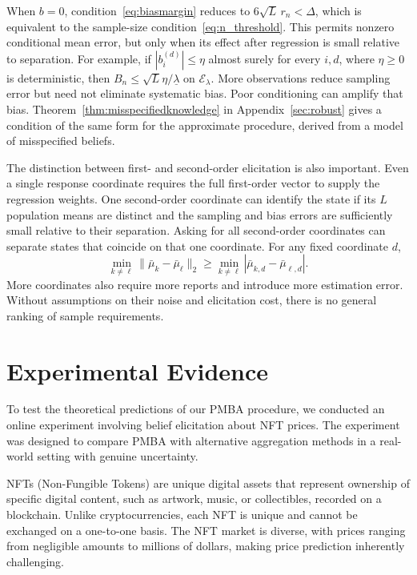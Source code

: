 \documentclass[12pt,reqno]{amsart}
\begin{document}
When $b=0$,
condition~\eqref{eq:biasmargin} reduces to $6\sqrt L\,r_n<\Delta$,
which is equivalent to the sample-size condition~\eqref{eq:n_threshold}. This permits nonzero conditional mean
error, but only when its effect after regression is small relative to
separation. For example, if $|b_i^{(d)}|\leq\eta$ almost surely for every
$i,d$, where $\eta\ge0$ is deterministic, then $B_n\leq\sqrt
L\eta/\underline\lambda$ on $\mathcal{E}_\lambda$. More observations reduce sampling
error but need not eliminate systematic bias. Poor conditioning can amplify
that bias. Theorem~\ref{thm:misspecifiedknowledge} in Appendix~\ref{sec:robust} gives a condition of the same form for the approximate procedure, derived from a model of misspecified beliefs.

The distinction between first- and second-order elicitation is also
important. Even a single response coordinate requires the full first-order
vector to supply the regression weights. One second-order
coordinate can identify the state if its $L$ population means are distinct
and the sampling and bias errors are sufficiently small relative to their
separation. Asking for all second-order coordinates can separate states
that coincide on that one coordinate. For any fixed coordinate $d$,
\begin{equation*}
\min_{k\ne\ell}\|\bar\mu_k-\bar\mu_\ell\|_2
\geq\min_{k\ne\ell}|\bar\mu_{k,d}-\bar\mu_{\ell,d}|.
\end{equation*}
More coordinates also require more reports and introduce
more estimation error. Without assumptions on their noise and elicitation
cost, there is no general ranking of sample requirements.

\section{Experimental Evidence}\label{sec:experiment}

To test the theoretical predictions of our PMBA procedure, we conducted an online experiment involving belief elicitation about NFT prices. The experiment was designed to  compare PMBA with alternative aggregation methods in a real-world setting with genuine uncertainty.

NFTs (Non-Fungible Tokens) are unique digital assets that represent ownership of specific digital content, such as artwork, music, or collectibles, recorded on a blockchain. Unlike cryptocurrencies, each NFT is unique and cannot be exchanged on a one-to-one basis. The NFT market is diverse, with prices ranging from negligible amounts to millions of dollars, making price prediction inherently challenging.
\end{document}
